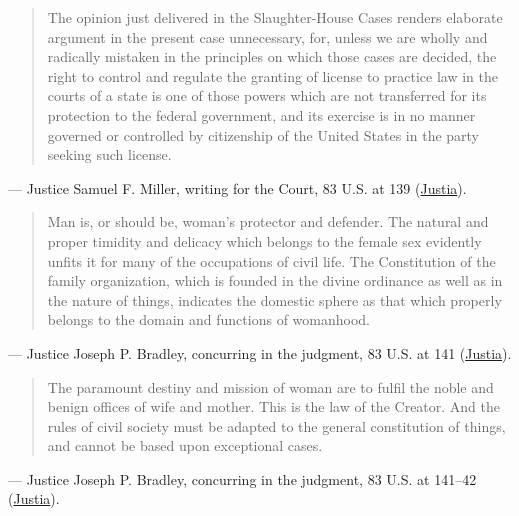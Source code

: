 \documentclass[12pt]{article}
\begin{document}
\begin{quote}
The opinion just delivered in the Slaughter-House Cases renders elaborate argument in the present case unnecessary, for, unless we are wholly and radically mistaken in the principles on which those cases are decided, the right to control and regulate the granting of license to practice law in the courts of a state is one of those powers which are not transferred for its protection to the federal government, and its exercise is in no manner governed or controlled by citizenship of the United States in the party seeking such license.
\end{quote}
\noindent --- Justice Samuel F. Miller, writing for the Court, 83 U.S. at 139 (\href{https://supreme.justia.com/cases/federal/us/83/130/}{Justia}).

\begin{quote}
Man is, or should be, woman's protector and defender. The natural and proper timidity and delicacy which belongs to the female sex evidently unfits it for many of the occupations of civil life. The Constitution of the family organization, which is founded in the divine ordinance as well as in the nature of things, indicates the domestic sphere as that which properly belongs to the domain and functions of womanhood.
\end{quote}
\noindent --- Justice Joseph P. Bradley, concurring in the judgment, 83 U.S. at 141 (\href{https://supreme.justia.com/cases/federal/us/83/130/}{Justia}).

\begin{quote}
The paramount destiny and mission of woman are to fulfil the noble and benign offices of wife and mother. This is the law of the Creator. And the rules of civil society must be adapted to the general constitution of things, and cannot be based upon exceptional cases.
\end{quote}
\noindent --- Justice Joseph P. Bradley, concurring in the judgment, 83 U.S. at 141--42 (\href{https://supreme.justia.com/cases/federal/us/83/130/}{Justia}).
\end{document}
